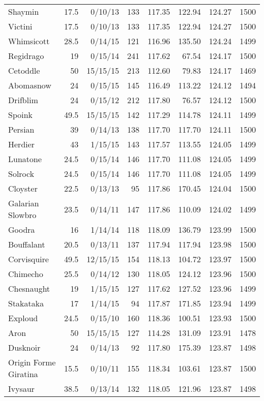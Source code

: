 \begin{longtable}{lrrrrrrr}
Shaymin & 17.5 & 0/10/13 & 133 & 117.35 & 122.94 & 124.27 & 1500\\
Victini & 17.5 & 0/10/13 & 133 & 117.35 & 122.94 & 124.27 & 1500\\
Whimsicott & 28.5 & 0/14/15 & 121 & 116.96 & 135.50 & 124.24 & 1499\\
Regidrago & 19 & 0/15/14 & 241 & 117.62 & 67.54 & 124.17 & 1500\\
Cetoddle & 50 & 15/15/15 & 213 & 112.60 & 79.83 & 124.17 & 1469\\
Abomasnow & 24 & 0/15/15 & 145 & 116.49 & 113.22 & 124.12 & 1494\\
Drifblim & 24 & 0/15/12 & 212 & 117.80 & 76.57 & 124.12 & 1500\\
Spoink & 49.5 & 15/15/15 & 142 & 117.29 & 114.78 & 124.11 & 1499\\
Persian & 39 & 0/14/13 & 138 & 117.70 & 117.70 & 124.11 & 1500\\
Herdier & 43 & 1/15/15 & 143 & 117.57 & 113.55 & 124.05 & 1499\\
Lunatone & 24.5 & 0/15/14 & 146 & 117.70 & 111.08 & 124.05 & 1499\\
Solrock & 24.5 & 0/15/14 & 146 & 117.70 & 111.08 & 124.05 & 1499\\
Cloyster & 22.5 & 0/13/13 & 95 & 117.86 & 170.45 & 124.04 & 1500\\
Galarian Slowbro & 23.5 & 0/14/11 & 147 & 117.86 & 110.09 & 124.02 & 1499\\
Goodra & 16 & 1/14/14 & 118 & 118.09 & 136.79 & 123.99 & 1500\\
Bouffalant & 20.5 & 0/13/11 & 137 & 117.94 & 117.94 & 123.98 & 1500\\
Corvisquire & 49.5 & 12/15/15 & 154 & 118.13 & 104.72 & 123.97 & 1500\\
Chimecho & 25.5 & 0/14/12 & 130 & 118.05 & 124.12 & 123.96 & 1500\\
Chesnaught & 19 & 1/15/15 & 127 & 117.62 & 127.52 & 123.96 & 1499\\
Stakataka & 17 & 1/14/15 & 94 & 117.87 & 171.85 & 123.94 & 1499\\
Exploud & 24.5 & 0/15/10 & 160 & 118.36 & 100.51 & 123.93 & 1500\\
Aron & 50 & 15/15/15 & 127 & 114.28 & 131.09 & 123.91 & 1478\\
Dusknoir & 24 & 0/14/13 & 92 & 117.80 & 175.39 & 123.87 & 1498\\
Origin Forme Giratina & 15.5 & 0/10/11 & 155 & 118.34 & 103.61 & 123.87 & 1500\\
Ivysaur & 38.5 & 0/13/14 & 132 & 118.05 & 121.96 & 123.87 & 1498\\

\end{longtable}
